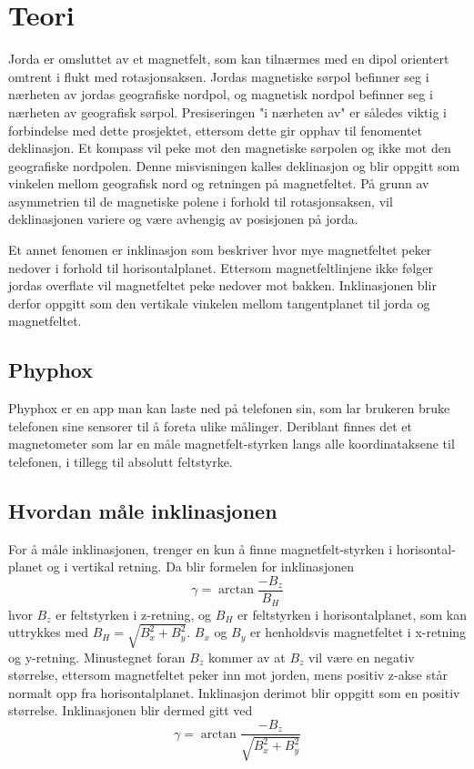 \section{Teori}
Jorda er omsluttet av et magnetfelt, som kan tilnærmes med en 
dipol orientert omtrent i flukt med rotasjonsaksen. Jordas magnetiske sørpol 
befinner seg i nærheten av jordas geografiske nordpol, og magnetisk nordpol 
befinner seg i nærheten av geografisk sørpol. Presiseringen "i nærheten av" 
er således viktig i forbindelse med dette prosjektet, ettersom dette gir 
opphav til fenomentet deklinasjon. Et kompass vil peke mot den magnetiske sørpolen og ikke mot den geografiske nordpolen.
Denne misvisningen kalles deklinasjon og blir oppgitt som vinkelen mellom 
geografisk nord og retningen på magnetfeltet. På grunn av asymmetrien til 
de magnetiske polene i forhold til rotasjonsaksen, vil deklinasjonen 
variere og være avhengig av posisjonen på jorda. \cite{World_magnetic_model}

Et annet fenomen er inklinasjon som beskriver hvor mye magnetfeltet peker 
nedover i forhold til horisontalplanet. Ettersom magnetfeltlinjene ikke følger jordas overflate vil 
magnetfeltet peke nedover mot bakken. Inklinasjonen 
blir derfor oppgitt som den vertikale vinkelen mellom tangentplanet til jorda og
magnetfeltet.

\subsection{Phyphox}
Phyphox er en app man kan laste ned på telefonen sin, som lar brukeren 
bruke telefonen sine sensorer til å foreta ulike målinger. Deriblant finnes 
det et magnetometer som lar en måle magnetfelt-styrken langs alle 
koordinataksene til telefonen, i tillegg til absolutt feltstyrke. 
\cite{phyphox}

\subsection{Hvordan måle inklinasjonen}
For å måle inklinasjonen, trenger en kun å finne magnetfelt-styrken i horisontal-
planet og i vertikal retning. Da blir formelen for inklinasjonen 
\begin{equation}
    \gamma = \arctan \frac{-B_z}{B_H} 
\end{equation}
hvor $B_z$ er feltstyrken i z-retning, og $B_H$ er feltstyrken i horisontalplanet, som kan 
uttrykkes med $B_H = \sqrt{B_x^2 + B_y^2}$. $B_x$ og $B_y$ er henholdsvis magnetfeltet i x-retning
og y-retning.
Minustegnet foran $B_z$ kommer av at $B_z$ vil være en negativ størrelse, ettersom magnetfeltet peker inn mot 
jorden, mens 
positiv z-akse står normalt opp fra horisontalplanet. Inklinasjon derimot blir oppgitt 
som en positiv størrelse.
Inklinasjonen blir dermed gitt ved
\begin{equation}
    \label{eq:inclination}
    \gamma = \arctan{ \frac{-B_z}{\sqrt{B_x^2 + B_y^2}} }
\end{equation}

